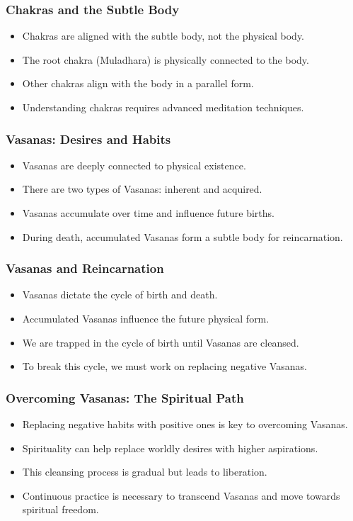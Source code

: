 \begin{frame}\frametitle{Chakras and the Subtle Body}
  \begin{itemize}
    \item Chakras are aligned with the subtle body, not the physical body.
    \item The root chakra (Muladhara) is physically connected to the body.
    \item Other chakras align with the body in a parallel form.
    \item Understanding chakras requires advanced meditation techniques.
  \end{itemize}
\end{frame}

\begin{frame}\frametitle{Vasanas: Desires and Habits}
  \begin{itemize}
    \item Vasanas are deeply connected to physical existence.
    \item There are two types of Vasanas: inherent and acquired.
    \item Vasanas accumulate over time and influence future births.
    \item During death, accumulated Vasanas form a subtle body for reincarnation.
  \end{itemize}
\end{frame}

\begin{frame}\frametitle{Vasanas and Reincarnation}
  \begin{itemize}
    \item Vasanas dictate the cycle of birth and death.
    \item Accumulated Vasanas influence the future physical form.
    \item We are trapped in the cycle of birth until Vasanas are cleansed.
    \item To break this cycle, we must work on replacing negative Vasanas.
  \end{itemize}
\end{frame}

\begin{frame}\frametitle{Overcoming Vasanas: The Spiritual Path}
  \begin{itemize}
    \item Replacing negative habits with positive ones is key to overcoming Vasanas.
    \item Spirituality can help replace worldly desires with higher aspirations.
    \item This cleansing process is gradual but leads to liberation.
    \item Continuous practice is necessary to transcend Vasanas and move towards spiritual freedom.
  \end{itemize}
\end{frame}

